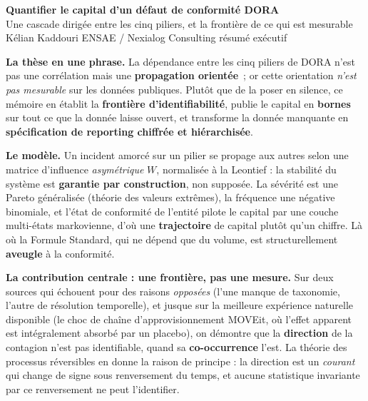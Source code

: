 \documentclass[10pt,a4paper]{article}
\begin{document}
\begin{center}
{\color{navy}\Large\bfseries Quantifier le capital d'un défaut de conformité DORA}\\[2pt]
{\color{bluemid}\large Une cascade dirigée entre les cinq piliers, et la frontière de ce qui est mesurable}\\[3pt]
{\small Kélian Kaddouri \textbullet{} ENSAE / Nexialog Consulting \textbullet{} résumé exécutif}
\end{center}
\vspace{-2pt}

\begin{cle}
\textbf{La thèse en une phrase.} La dépendance entre les cinq piliers de DORA n'est pas une
corrélation mais une \textbf{propagation orientée}~; or cette orientation \emph{n'est pas
mesurable} sur les données publiques. Plutôt que de la poser en silence, ce mémoire en établit
la \textbf{frontière d'identifiabilité}, publie le capital en \textbf{bornes} sur tout ce que la
donnée laisse ouvert, et transforme la donnée manquante en \textbf{spécification de reporting
chiffrée et hiérarchisée}.
\end{cle}

\textbf{Le modèle.} Un incident amorcé sur un pilier se propage aux autres selon une matrice
d'influence \emph{asymétrique} $W$, normalisée à la Leontief : la stabilité du système est
\textbf{garantie par construction}, non supposée. La sévérité est une Pareto généralisée (théorie
des valeurs extrêmes), la fréquence une négative binomiale, et l'état de conformité de l'entité
pilote le capital par une couche multi-états markovienne, d'où une \textbf{trajectoire} de
capital plutôt qu'un chiffre. Là où la Formule Standard, qui ne dépend que du volume, est
structurellement \textbf{aveugle} à la conformité.

\textbf{La contribution centrale : une frontière, pas une mesure.} Sur deux sources qui échouent
pour des raisons \emph{opposées} (l'une manque de taxonomie, l'autre de résolution temporelle),
et jusque sur la meilleure expérience naturelle disponible (le choc de chaîne
d'approvisionnement MOVEit, où l'effet apparent est intégralement absorbé par un placebo), on
démontre que la \textbf{direction} de la contagion n'est pas identifiable, quand sa
\textbf{co-occurrence} l'est. La théorie des processus réversibles en donne la raison de
principe : la direction est un \emph{courant} qui change de signe sous renversement du temps,
et aucune statistique invariante par ce renversement ne peut l'identifier.
\end{document}
